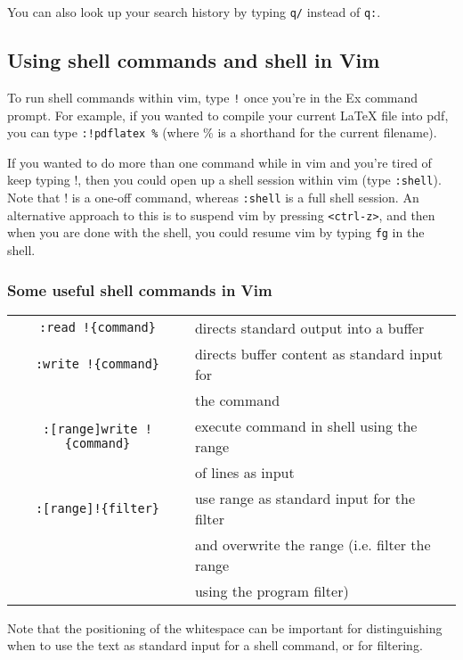 You can also look up your search history by typing \verb|q/| instead of \verb|q:|.

\subsection{Using shell commands and shell in Vim}

To run shell commands within vim, type \verb|!| once you're in the Ex command prompt.
For example, if you wanted to compile your current \LaTeX{} file into pdf, you can type \verb|:!pdflatex %| (where \% is a shorthand for the current filename).

If you wanted to do more than one command while in vim and you're tired of keep typing !, then you could open up a shell session within vim (type \verb|:shell|).
Note that ! is a one-off command, whereas \verb|:shell| is a full shell session.
An alternative approach to this is to suspend vim by pressing \verb|<ctrl-z>|, and then when you are done with the shell, you could resume vim by typing \verb|fg| in the shell.

\subsubsection{Some useful shell commands in Vim}

\begin{tabular}{c|l}
    \verb|:read !{command}|         & directs standard output into a buffer\\
    \verb|:write !{command}|        & directs buffer content as standard input for\\
                                    & the command\\
    \verb|:[range]write !{command}| & execute command in shell using the range\\
                                    & of lines as input\\
    \verb|:[range]!{filter}|        & use range as standard input for the filter\\
                                    & and overwrite the range (i.e. filter the range\\
                                    & using the program filter)\\
\end{tabular}
\newline

Note that the positioning of the whitespace can be important for distinguishing when to use the text as standard input for a shell command, or for filtering.
